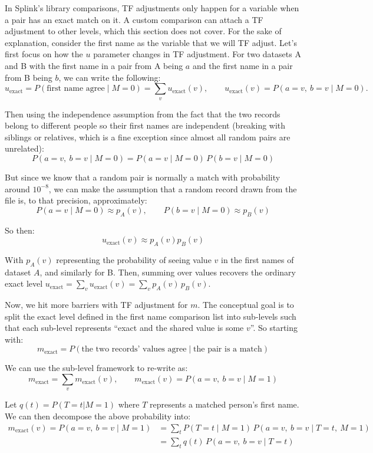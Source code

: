 \documentclass[11pt]{article}
\begin{document}
In Splink's library comparisons, TF adjustments only happen for a variable when a pair has an exact match on it. A custom comparison can attach a TF adjustment to other levels, which this section does not cover. For the sake of explanation, consider the first name as the variable that we will TF adjust. Let's first focus on how the $u$ parameter changes in TF adjustment. For two datasets A and B with the first name in a pair from A being $a$ and the first name in a pair from B being $b$, we can write the following:
\[
u_{\text{exact}} = P(\text{first name agree}\mid M=0) = \sum_v u_{\text{exact}}(v), \qquad u_{\text{exact}}(v) = P(a=v,\ b=v \mid M=0).
\]

Then using the independence assumption from the fact that the two records belong to different people so their first names are independent (breaking with siblings or relatives, which is a fine exception since almost all random pairs are unrelated):
\[
P(a = v,\ b = v \mid M=0) = P(a = v \mid M=0)\, P(b = v \mid M=0)
\]

But since we know that a random pair is normally a match with probability around $10^{-8}$, we can make the assumption that a random record drawn from the file is, to that precision, approximately:
\[
P(a = v \mid M=0) \approx p_A(v), \qquad P(b = v \mid M=0) \approx p_B(v)
\]

So then:
\[
u_{\text{exact}}(v) \approx p_A(v)p_B(v)
\]

With $p_A(v)$ representing the probability of seeing value $v$ in the first names of dataset $A$, and similarly for B. Then, summing over values recovers the ordinary exact level $u_{\text{exact}} = \sum_v u_{\text{exact}}(v)=  \sum_v p_A(v)\,p_B(v).$

Now, we hit more barriers with TF adjustment for $m$. The conceptual goal is to split the exact level defined in the first name comparison list into sub-levels such that each sub-level represents ``exact and the shared value is some $v$''. So starting with:
\[
m_{\text{exact}} = P(\text{the two records' values agree} \mid \text{the pair is a match})
\]

We can use the sub-level framework to re-write as:
\[
m_{\text{exact}} = \sum_v m_{\text{exact}}(v), \qquad m_{\text{exact}}(v) = P(a = v,\ b = v \mid M=1)
\]

Let $q(t) = P(T = t |M=1)$ where $T$ represents a matched person's first name. We can then decompose the above probability into:
\[
\begin{aligned}
m_{\text{exact}}(v) = P(a = v,\ b = v \mid M=1) &= \sum_t P(T = t \mid M=1)\, P(a = v,\ b = v \mid T = t,\ M=1) \\
&= \sum_t q(t)\, P(a = v,\ b = v \mid T = t)
\end{aligned}
\]
\end{document}
